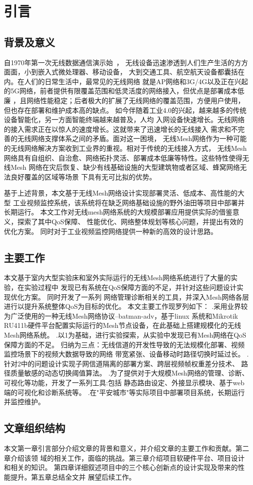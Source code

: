 \chapter{引言}
\label{cha:intro}

\section{背景及意义}
自1970年第一次无线数据通信演示始~\cite{IEEE80211}，
无线设备迅速渗透到人们生产生活的方方面面，小到嵌入式微处理器、移动设备，
大到交通工具、航空航天设备都囊括在内。在人们的日常生活中，最常见的无线网络
就是AP网络和3G/4G以及正在兴起的5G网络，前者提供有限覆盖范围和低灵活度的网络接入，但优点是部署成本低廉
，且网络性能稳定；后者极大的扩展了无线网络的覆盖范围，方便用户使用，
但也存在部署和维护成本高的缺点。
如今伴随着工业4.0的兴起，越来越多的传统设备智能化，另一方面智能终端越来越普及，人均
入网设备快速增长。无线网络的接入需求正在以惊人的速度增长。这就带来了迅速增长的无线接入
需求和不完善的无线网络支撑体系之间的矛盾。面对这一困境，
无线Mesh网络作为一种可能的无线网络解决方案收到工业界的重视。相对于传统的无线接入方式，
无线Mesh网络具有自组织、自治愈、网络拓扑灵活、部署成本低廉等特性。这些特性使得无线Mesh
网络在灾后恢复、缺少有线基础设施的大型建筑物或者区域、蜂窝网络无法良好覆盖的区域等场景
下具有无可比拟的优势。

基于上述背景，本文基于无线Mesh网络设计实现部署灵活、低成本、高性能的大型
工业视频监控系统，该系统将在缺乏网络基础设施的野外油田等项目中部署并长期运行。
本文工作对无线mesh网络系统的大规模部署应用提供实际的借鉴意义，探索了其中QoS保障、
性能优化、网络整体规划等核心问题，并提出有效的优化方案。
同时对于工业视频监控网络提供一种新的高效的设计思路。

\section{主要工作}
本文基于室内大型实验床和室外实际运行的无线Mesh网络系统进行了大量的实验，在实验过程中
发现已有系统在QoS保障方面的不足，并针对这些问题设计实现优化方案。
同时开发了一系列
网络管理诊断相关的工具，并深入Mesh网络各层进行以提升系统整体QoS为目标的优化。
本文主要工作现罗列如下：
.采用业界较为广泛使用的一种无线Mesh网络协议--batman-adv，基于linux
系统和Mikrotik RU411b硬件平台配置实际运行的Mesh节点设备，在此基础上搭建规模化的无线Mesh网络系统。
.以1为基础，进行实验探索，从实验中发现已有Mesh网络在QoS保障方面的不足。
归纳为三点：无线信道的开发性导致的无法规模化部署、视频监控场景下的视频大数据导致的网络
带宽紧张、设备移动时路径切换时延过长。
.针对2中的问题设计实现子网信道隔离的部署方案、跨层视频帧权重差分技术、
路径质量敏感的动态切换阈值算法。
.为了提供对于大规模Mesh网络的管理、诊断、可视化等功能，开发了一系列工具:包括
静态路由设定、外接显示模块、基于web端的可视化和诊断系统等。
.在"平安城市"等实际项目中部署项目系统，长期运行并监控维护。

\section{文章组织结构}
本文第一章引言部分介绍文章的背景和意义，并介绍文章的主要工作和贡献。第二章介绍该领
域的相关工作，面临的挑战。第三章介绍项目软硬件平台、项目设计和相关的知识。
第四章详细叙述项目中的三个核心创新点的设计实现及带来的性能提升。第五章总结全文并
展望后续工作。


